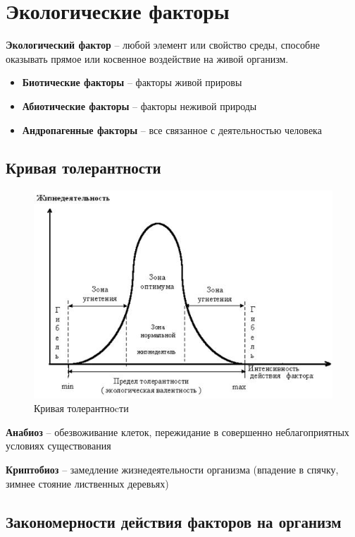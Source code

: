 \chapter{Экологические факторы}

\textbf{Экологический фактор} -- любой элемент или свойство среды,
способне оказывать прямое или косвенное воздействие на живой организм.

\begin{itemize}
    \item \textbf{Биотические факторы} --
        факторы живой прировы
    \item \textbf{Абиотические факторы} --
        факторы неживой природы
    \item \textbf{Андропагенные факторы} --
        все связанное с деятельностью человека
\end{itemize}

\section{Кривая толерантности}

\begin{figure}[H]
    \centering
    \includegraphics{img/tolerant.jpg}
    \caption{Кривая толерантноcти}
\end{figure}

\textbf{Анабиоз} -- обезвоживание клеток, пережидание в совершенно
неблагоприятных условиях существования

\textbf{Криптобиоз} -- замедление жизнедеятельности организма
(впадение в спячку, зимнее стояние лиственных деревьях)

\section{Закономерности действия факторов на организм}

